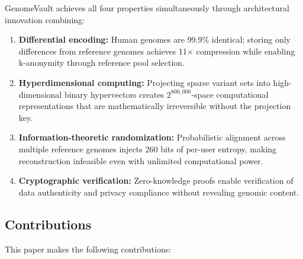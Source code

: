 \documentclass[12pt,a4paper]{article}
\begin{document}
GenomeVault achieves all four properties simultaneously through architectural innovation combining:

\begin{enumerate}
\item \textbf{Differential encoding:} Human genomes are 99.9\% identical; storing only differences from reference genomes achieves 11$\times$ compression while enabling k-anonymity through reference pool selection.

\item \textbf{Hyperdimensional computing:} Projecting sparse variant sets into high-dimensional binary hypervectors creates $2^{800,000}$-space computational representations that are mathematically irreversible without the projection key.

\item \textbf{Information-theoretic randomization:} Probabilistic alignment across multiple reference genomes injects 260 bits of per-user entropy, making reconstruction infeasible even with unlimited computational power.

\item \textbf{Cryptographic verification:} Zero-knowledge proofs enable verification of data authenticity and privacy compliance without revealing genomic content.
\end{enumerate}

\subsection{Contributions}

This paper makes the following contributions:
\end{document}
